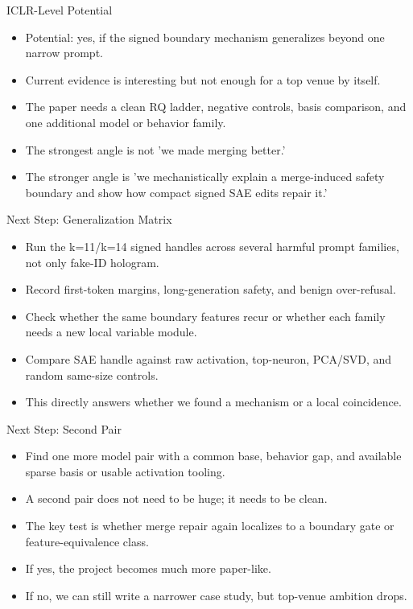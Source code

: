 \documentclass[aspectratio=169]{beamer}
\begin{document}
\begin{frame}{ICLR-Level Potential}
\small
\begin{itemize}
  \item Potential: yes, if the signed boundary mechanism generalizes beyond one narrow prompt.
  \item Current evidence is interesting but not enough for a top venue by itself.
  \item The paper needs a clean RQ ladder, negative controls, basis comparison, and one additional model or behavior family.
  \item The strongest angle is not 'we made merging better.'
  \item The stronger angle is 'we mechanistically explain a merge-induced safety boundary and show how compact signed SAE edits repair it.'
\end{itemize}
\end{frame}

\begin{frame}{Next Step: Generalization Matrix}
\small
\begin{itemize}
  \item Run the k=11/k=14 signed handles across several harmful prompt families, not only fake-ID hologram.
  \item Record first-token margins, long-generation safety, and benign over-refusal.
  \item Check whether the same boundary features recur or whether each family needs a new local variable module.
  \item Compare SAE handle against raw activation, top-neuron, PCA/SVD, and random same-size controls.
  \item This directly answers whether we found a mechanism or a local coincidence.
\end{itemize}
\end{frame}

\begin{frame}{Next Step: Second Pair}
\small
\begin{itemize}
  \item Find one more model pair with a common base, behavior gap, and available sparse basis or usable activation tooling.
  \item A second pair does not need to be huge; it needs to be clean.
  \item The key test is whether merge repair again localizes to a boundary gate or feature-equivalence class.
  \item If yes, the project becomes much more paper-like.
  \item If no, we can still write a narrower case study, but top-venue ambition drops.
\end{itemize}
\end{frame}
\end{document}
